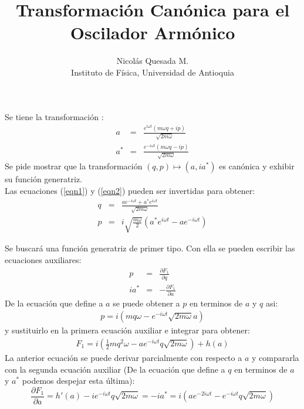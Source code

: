 \documentclass[letterpaper,12pt]{article}
\title{Transformaci\'on Can\'onica para el Oscilador Arm\'onico}
\author{Nicol\'as Quesada M.\\{\small \sf Instituto de F\'isica, Universidad de Antioquia}}
\date{}
\begin{document}
\maketitle

Se tiene la transformaci\'on :
\begin{eqnarray}
a&=&\frac{e^{i  \omega t} (m \omega q + i p )}{
   \sqrt{ 2 m \omega }} 
\label{eqn1}
\\
a^*&=&\frac{e^{-i  \omega t} (m \omega q - i p)}{
   \sqrt{ 2m \omega }} 
\label{eqn2}
\end{eqnarray}
Se pide mostrar que la transformaci\'on $(q,p)\longmapsto(a,ia^{*})$ es can\'onica y exhibir su funci\'on generatriz.\\

Las ecuaciones (\ref{eqn1}) y (\ref{eqn2}) pueden ser invertidas para obtener:
\begin{eqnarray}
q&=&\frac{ a e^{-i \omega t }+a^* e^{i \omega t}}{\sqrt{2 m \omega}}\\
p&=&i  \sqrt{\frac{m \omega}{2}} \left(a^* e^{i \omega t}-a e^{-i \omega t}\right)
\end{eqnarray}

Se buscar\'a una funci\'on generatriz de primer tipo. Con ella se pueden escribir las ecuaciones auxiliares:
\begin{eqnarray}
p&=&\frac{\partial F_1}{\partial q} \\
i a^*&=&-\frac{\partial F_1}{\partial a} 
\end{eqnarray}
De la ecuaci\'on que define a $a$ se puede obtener a $p$ en terminos de $a$ y $q$ asi:
\begin{eqnarray}
p=i \left(m q \omega - e^{-i \omega t} \sqrt{2 m \omega} a \right)
\end{eqnarray}
y sustituirlo en la primera ecuaci\'on auxiliar e integrar para obtener:
\begin{eqnarray}
F_1=i \left(\frac{1}{2} m q^2 \omega - a e^{-i 
   \omega t} q \sqrt{2 m \omega }\right)+h(a)
\end{eqnarray}
La anterior ecuaci\'on se puede derivar parcialmente con respecto a $a$ y compararla con la segunda ecuaci\'on auxiliar (De la ecuaci\'on que define a $q$ en terminos de $a$ y $a^*$ podemos despejar esta \'ultima):
\begin{equation}
\frac{\partial F_1}{\partial a}=h'(a)-i  e^{-i  \omega t} q \sqrt{2 m \omega }=-i a^*=i \left(a e^{-2 i  \omega t}- e^{-i  \omega t } q \sqrt{2 m \omega }\right)
\end{equation}
\end{document}
